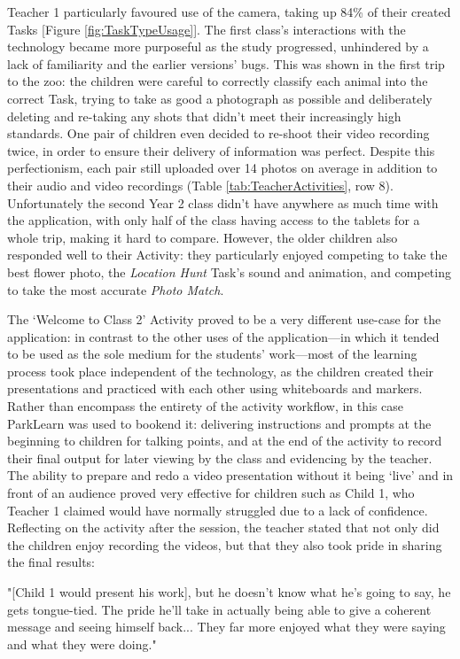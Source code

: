 Teacher 1 particularly favoured use of the camera, taking up 84\% of their created Tasks [Figure \ref{fig:TaskTypeUsage}]. The first class's interactions with the technology became more purposeful as the study progressed, unhindered by a lack of familiarity and the earlier versions' bugs. This was shown in the first trip to the zoo: the children were careful to correctly classify each animal into the correct Task, trying to take as good a photograph as possible and deliberately deleting and re-taking any shots that didn't meet their increasingly high standards. One pair of children even decided to re-shoot their video recording twice, in order to ensure their delivery of information was perfect. Despite this perfectionism, each pair still uploaded over 14 photos on average in addition to their audio and video recordings (Table \ref{tab:TeacherActivities}, row 8). Unfortunately the second Year 2 class didn't have anywhere as much time with the application, with only half of the class having access to the tablets for a whole trip, making it hard to compare. However, the older children also responded well to their Activity: they particularly enjoyed competing to take the best flower photo, the \textit{Location Hunt} Task’s sound and animation, and competing to take the most accurate \textit{Photo Match}.

The `Welcome to Class 2' Activity proved to be a very different use-case for the application: in contrast to the other uses of the application---in which it tended to be used as the sole medium for the students' work---most of the learning process took place independent of the technology, as the children created their presentations and practiced with each other using whiteboards and markers. Rather than encompass the entirety of the activity workflow, in this case ParkLearn was used to bookend it: delivering instructions and prompts at the beginning to children for talking points, and at the end of the activity to record their final output for later viewing by the class and evidencing by the teacher. The ability to prepare and redo a video presentation without it being `live' and in front of an audience proved very effective for children such as Child 1, who Teacher 1 claimed would have normally struggled due to a lack of confidence. Reflecting on the activity after the session, the teacher stated that not only did the children enjoy recording the videos, but that they also took pride in sharing the final results: 

\begin{displayquote}
"[Child 1 would present his work], but he doesn't know what he’s going to say, he gets tongue-tied. The pride he’ll take in actually being able to give a coherent message and seeing himself back... They far more enjoyed what they were saying and what they were doing."
\end{displayquote}

